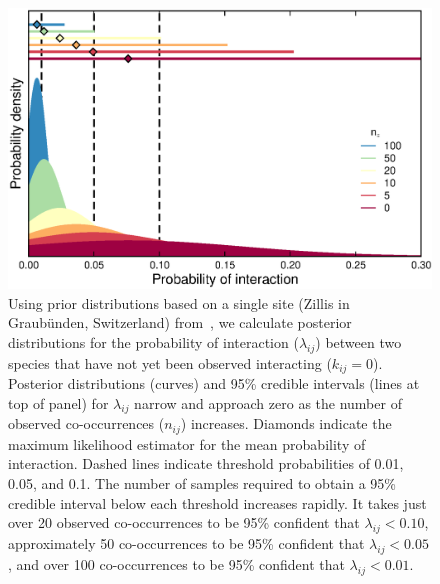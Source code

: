 \documentclass[12pt]{article}
\begin{document}
  \begin{figure}[h!]
    \caption{Using prior distributions based on a single site (Zillis in Graub\"{u}nden, Switzerland) from~\citet{Kopelke2017}, we calculate posterior distributions for the probability of interaction ($\lambda_{ij}$) between two species that have not yet been observed interacting ($k_{ij} = 0$). 
    Posterior distributions (curves) and 95\% credible intervals (lines at top of panel) for $\lambda_{ij}$ narrow and approach zero as the number of observed co-occurrences ($n_{ij}$) increases. Diamonds indicate the maximum likelihood estimator for the mean probability of interaction.
    Dashed lines indicate threshold probabilities of 0.01, 0.05, and 0.1. The number of samples required to obtain a 95\% credible interval below each threshold increases rapidly. It takes just over 20 observed co-occurrences to be 95\% confident that $\lambda_{ij}<0.10$, approximately 50 co-occurrences to be 95\% confident that $\lambda_{ij}<0.05$, and over 100 co-occurrences to be 95\% confident that $\lambda_{ij}<0.01$.}
    \label{Salix_pdfs_cdfs}
    \begin{center}
    \includegraphics*[width=.8\textwidth]{figures/GP_pdfs_increasing_N_Zillis.eps}
    \end{center}
    \end{figure}
\end{document}
